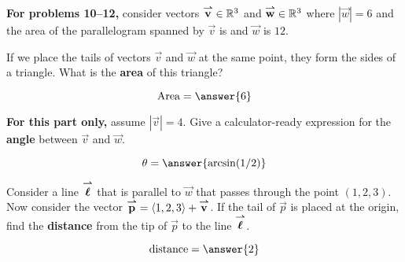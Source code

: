 \documentclass{ximera}
\author{Bart Snapp}
\begin{document}
\textbf{For problems 10--12,} consider vectors ${\overset{\boldsymbol{\rightharpoonup}}{\mathbf{v}}}\in\mathbb R^3$ and
${\overset{\boldsymbol{\rightharpoonup}}{\mathbf{w}}}\in\mathbb R^3$ where $|\vec{w}|=6$ and the area of the parallelogram
spanned by $\vec{v}$ is and $\vec{w}$ is $12$.


\begin{problem}
  If we place the tails of vectors $\vec{v}$ and $\vec{w}$ at the same
  point, they form the sides of a triangle. What is the \textbf{area} of this triangle?
  \begin{prompt}
    \[
    \text{Area} = \answer{6}
    \]
  \end{prompt}
  \vspace{1in}
  
\end{problem}




\begin{problem}
  \textbf{For this part only,} assume $|\vec{v}| = 4$. Give a calculator-ready
  expression for the \textbf{angle} between $\vec{v}$ and $\vec{w}$.
  \begin{prompt}
    \[
    \theta = \answer{\arcsin(1/2)}
    \]
  \end{prompt}
  \vfill
\end{problem}



\begin{problem} 
Consider a line ${\overset{\boldsymbol{\rightharpoonup}}{\mathbf{\boldsymbol{\ell}}}}$ that is parallel to $\vec{w}$ that passes
through the point $(1,2,3)$. Now consider the vector ${\overset{\boldsymbol{\rightharpoonup}}{\mathbf{p}}} =
\left\langle 1,2,3\right\rangle+{\overset{\boldsymbol{\rightharpoonup}}{\mathbf{v}}}$. If the tail of $\vec{p}$ is placed at the
origin, find the \textbf{distance} from the tip of $\vec{p}$ to the line
${\overset{\boldsymbol{\rightharpoonup}}{\mathbf{\boldsymbol{\ell}}}}$.

\vfill

\begin{prompt}
  \[
  \mathrm{distance} = \answer{2}
  \]
\end{prompt}
\end{problem}
\end{document}
